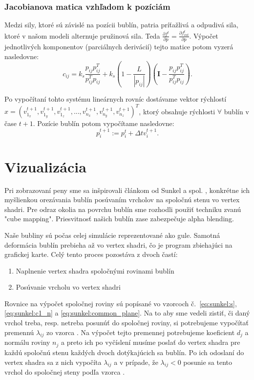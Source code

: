 \subsubsection{Jacobianova matica vzhľadom k pozíciám}

Medzi sily, ktoré sú závislé na pozícii bublín, patria príťažlivá a odpudivá sila, ktoré v našom modeli alternuje pružinová sila. Teda $\frac{\partial f^{t}}{\partial p} = \frac{\partial f_{int}^{t}}{\partial p}$. Výpočet jednotlivých komponentov (parciálnych derivácií) tejto matice potom vyzerá nasledovne:
\begin{equation}
	c_{ij} = k_{s}\frac{p_{ij}p_{ij}^{T}}{p_{ij}^{T}p_{ij}} + k_{s}\left ( 1 - \frac{L}{\left | p_{ij} \right |} \right )\left ( \mathbf{I} - \frac{p_{ij}p_{ij}^{T}}{p_{ij}^{T}p_{ij}} \right ).
\end{equation}

\noindent Po vypočítaní tohto systému lineárnych rovníc dostávame vektor rýchlostí $x = (v_{1_{x}}^{t+1}, v_{1_{y}}^{t+1}, v_{1_{z}}^{t+1}, ..., v_{n_{x}}^{t+1}, v_{n_{y}}^{t+1}, v_{n_{z}}^{t+1})^{T}$, ktorý obsahuje rýchlosti $\forall$ bublín v čase $t+1$. Pozície bublín potom vypočítame nasledovne:
\begin{equation}
	\label{eq:compute_positions_t_plus_1}
	p_{i}^{t+1} := p_{i}^{t} + \Delta t v_{i}^{t+1}.
\end{equation}

\section{Vizualizácia}

Pri zobrazovaní peny sme sa inšpirovali článkom od Sunkel a spol. \cite{sunkel2004}, konkrétne ich myšlienkou orezávania bublín posúvaním vrcholov na spoločnú stenu vo vertex shadri. Pre odraz okolia na povrchu bublín sme rozhodli použiť techniku zvanú "cube mapping". Priesvitnosť našich bublín zase zabezpečuje alpha blending.

Naše bubliny sú počas celej simulácie reprezentované ako gule. Samotná deformácia bublín prebieha až vo vertex shadri, čo je program zbiehajúci na grafickej karte. Celý tento proces pozostáva z dvoch častí:
\begin{enumerate}
	\item Naplnenie vertex shadra spoločnými rovinami bublín
	\item Posúvanie vrcholu vo vertex shadri
\end{enumerate}

Rovnice na výpočet spoločnej roviny sú popísané vo vzorcoch č.~\ref{eq:sunkel:s}, \ref{eq:sunkel:c1_n} a \ref{eq:sunkel:common_plane}. Na to aby sme vedeli zistiť, či daný vrchol treba, resp. netreba posunúť do spoločnej roviny, si potrebujeme vypočítať premennú $\lambda_{ij}$ zo vzorca . Na výpočet tejto premennej potrebujeme koeficient $d_{j}$ a normálu roviny $n_{j}$ a preto ich po vyčíslení musíme poslať do vertex shadra pre každú spoločnú stenu každých dvoch dotýkajúcich sa bublín. Po ich odoslaní do vertex shadra sa z nich vypočíta $\lambda_{ij}$ a v prípade, že $\lambda_{ij} < 0$ posunie sa tento vrchol do spoločnej steny podľa vzorca .

